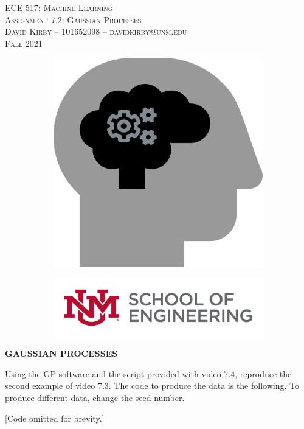 \documentclass[11pt]{article}
\begin{document}
\setmainfont{SF Pro Text}
\setsansfont{SF Pro Text}
\setmonofont{SF Mono}
\renewcommand{\familydefault}{\sfdefault}

\thispagestyle{empty}
\begin{titlepage}
\vspace*{\fill}
\begin{center}
\textsc{\Huge{ECE 517: Machine Learning}}\\[3em]
\textsc{\LARGE Assignment 7.2: Gaussian Processes}\\[6em]
\textsc{\Large David Kirby -- 101652098 -- davidkirby@unm.edu}\\[3em]
\textsc{\Large Fall 2021}
\end{center}
\vfill
\begin{figure}[h]
\begin{subfigure}{0.5\textwidth}
\includegraphics[width=0.25\linewidth]{learning.png}
\end{subfigure}
\begin{subfigure}{0.6\textwidth}\hspace{1em}
\includegraphics[width=0.8\linewidth]{new-soe-logo.png}
\end{subfigure}
\end{figure}
\end{titlepage}
\setcounter{figure}{0}

\hypersetup{
    linkcolor=CrispBlue,
    urlcolor=CrispBlue,
    breaklinks=true
}

\textbf{GAUSSIAN PROCESSES}

Using the GP software and the script provided with video 7.4, reproduce the second example of video 7.3. The code to produce the data is the following. To produce different data, change the seed number.

[Code omitted for brevity.]


\end{document}
